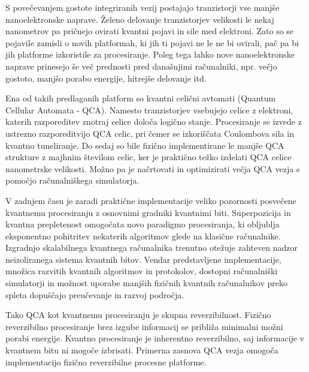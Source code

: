 \preface

S povečevanjem gostote integriranih vezij postajajo tranzistorji vse manjše nanoelektronske naprave. Želeno delovanje tranzistorjev velikosti le nekaj nanometrov pa pričnejo ovirati kvantni pojavi in sile med elektroni. Zato so se pojavile zamisli o novih platformah, ki jih ti pojavi ne le ne bi ovirali, pač pa bi jih platforme izkoristile za procesiranje. Poleg tega lahko nove nanoelektronske naprave prinesejo še več prednosti pred današnjimi računalniki, npr. večjo gostoto, manjšo porabo energije, hitrejše delovanje itd.


Ena od takih predlaganih platform so kvantni celični avtomati (Quantum Cellular Automata - QCA). Namesto tranzistorjev vsebujejo celice z elektroni, katerih razporeditev znotraj celice določa logično stanje. Procesiranje se izvede z ustrezno razporeditvijo QCA celic, pri čemer se izkoriščata Coulombova sila in kvantno tuneliranje. Do sedaj so bile fizično implementirane le manjše QCA strukture z majhnim številom celic, ker je praktično težko izdelati QCA celice nanometrske velikosti. Možno pa je načrtovati in optimizirati večja QCA vezja s pomočjo računalniškega simulatorja.


V zadnjem času je zaradi praktične implementacije veliko pozornosti posvečene kvantnemu procesiranju z osnovnimi gradniki kvantnimi biti. Superpozicija in kvantna prepletenost omogočata novo paradigmo procesiranja, ki obljublja eksponentno pohitritev nekaterih algoritmov glede na klasične računalnike. Izgradnjo skalabilnega kvantnega računalnika trenutno otežuje zahteven nadzor neizoliranega sistema kvantnih bitov. Vendar predstavljene implementacije, množica razvitih kvantnih algoritmov in protokolov, dostopni računalniški simulatorji in možnost uporabe manjših fizičnih kvantnih računalnikov preko spleta dopuščajo preučevanje in razvoj področja.


Tako QCA kot kvantnemu procesiranju je skupna reverzibilnost. Fizično reverzibilno procesiranje brez izgube informacij se približa minimalni možni porabi energije. Kvantno procesiranje je inherentno reverzibilno, saj informacije v kvantnem bitu ni mogoče izbrisati. Primerna zasnova QCA vezja omogoča implementacijo fizično reverzibilne procesne platforme.